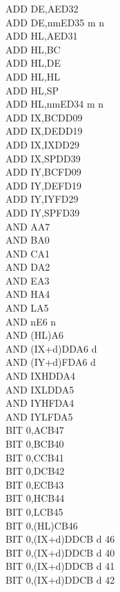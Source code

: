 \begin{multicols}{3}
{\begin{tabbing}
		ADD DE,A\ZXN\>ED32\\
		ADD DE,nm\ZXN\>ED35 m n\\
		ADD HL,A\ZXN\>ED31\\
		ADD HL,BC\\
		ADD HL,DE\\
		ADD HL,HL\\
		ADD HL,SP\\
		ADD HL,nm\ZXN\>ED34 m n\\
		ADD IX,BC\>DD09\\
		ADD IX,DE\>DD19\\
		ADD IX,IX\>DD29\\
		ADD IX,SP\>DD39\\
		ADD IY,BC\>FD09\\
		ADD IY,DE\>FD19\\
		ADD IY,IY\>FD29\\
		ADD IY,SP\>FD39\\
		AND A\>A7\\
		AND B\>A0\\
		AND C\>A1\\
		AND D\>A2\\
		AND E\>A3\\
		AND H\>A4\\
		AND L\>A5\\
		AND n\>E6 n\\
		AND (HL)\>A6\\
		AND (IX+d)\>DDA6 d\\
		AND (IY+d)\>FDA6 d\\
		AND IXH\UNDOC\>DDA4\\
		AND IXL\UNDOC\>DDA5\\
		AND IYH\UNDOC\>FDA4\\
		AND IYL\UNDOC\>FDA5\\
		BIT 0,A\>CB47\\
		BIT 0,B\>CB40\\
		BIT 0,C\>CB41\\
		BIT 0,D\>CB42\\
		BIT 0,E\>CB43\\
		BIT 0,H\>CB44\\
		BIT 0,L\>CB45\\
		BIT 0,(HL)\>CB46\\
		BIT 0,(IX+d)\>DDCB d 46\\
		BIT 0,(IX+d)\UNDOC\>DDCB d 40\\
		BIT 0,(IX+d)\UNDOC\>DDCB d 41\\
		BIT 0,(IX+d)\UNDOC\>DDCB d 42\\

\end{tabbing}}
\end{multicols}
